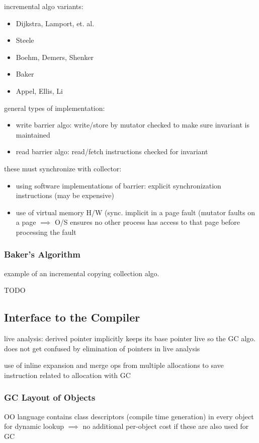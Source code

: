 \documentclass[8pt]{extarticle}
\begin{document}
\begin{multicols*}{2}
  incremental algo variants:
  \begin{itemize}
  \item Dijkstra, Lamport, et. al.
  \item Steele
  \item Boehm, Demers, Shenker
  \item Baker
  \item Appel, Ellis, Li
  \end{itemize}

  general types of implementation:
  \begin{itemize}
  \item write barrier algo: write/store by mutator checked to make sure invariant is maintained
  \item read barrier algo: read/fetch instructions checked for invariant
  \end{itemize}
  these must synchronize with collector:
  \begin{itemize}
  \item using software implementations of barrier: explicit synchronization instructions (may be expensive)
  \item use of virtual memory H/W (sync. implicit in a page fault (mutator faults on a page $\implies$ O/S ensures no other process has access to that page before processing the fault
  \end{itemize}

  \subsubsection{Baker's Algorithm}
  example of an incremental copying collection algo.

  TODO
  
  \subsection{Interface to the Compiler}
  live analysis: derived pointer implicitly keeps its base pointer live so the GC algo. does not get confused by elimination of pointers in live analysis

  use of inline expansion and merge ops from multiple allocations to save instruction related to allocation with GC

  \subsubsection{GC Layout of Objects}
  OO language contains class descriptors (compile time generation) in every object for dynamic lookup $\implies$ no additional per-object cost if these are also used for GC


\end{multicols*}
\end{document}
